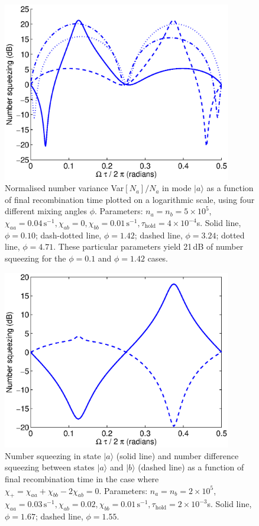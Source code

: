 \documentclass{iopart}
\begin{document}
\begin{figure}
    \centering
    \includegraphics[width=10cm]{figures/analytic_two_mode_examples.eps}
    \caption{Normalised number variance Var$[N_a]/N_a$ in mode $|a \rangle$ as a function of final recombination time plotted on a logarithmic scale, using four different mixing angles $\phi$. Parameters: $n_a = n_b =5 \times 10^5$, $\chi_{aa}=0.04\, \text{s}^{-1}, \chi_{ab}=0, \chi_{bb}=0.01\,\text{s}^{-1}, \tau_{\mathrm{hold}}=4\times 10^{-4}$s. Solid line, $\phi=0.10$; dash-dotted line, $\phi=1.42$; dashed line, $\phi=3.24$; dotted line, $\phi=4.71$. These particular parameters yield 21\,dB of number squeezing for the $\phi=0.1$ and $\phi=1.42$ cases.} 
    \label{figTwoModeAnalyticExamples}
\end{figure}

\begin{figure}
    \centering
    \includegraphics[width=10cm]{figures/zero_effective_chi.eps}
    \caption{Number squeezing in state $|a\rangle$ (solid line) and number difference squeezing between states $|a\rangle$ and $|b\rangle$ (dashed line) as a function of final recombination time in the case where $\chi_+ = \chi_{aa} + \chi_{bb} - 2 \chi_{ab} = 0$. Parameters: $n_a = n_b = 2 \times 10^5$, $\chi_{aa}=0.03\, \text{s}^{-1}, \chi_{ab}=0.02, \chi_{bb}=0.01\,\text{s}^{-1}, \tau_{\mathrm{hold}}=2\times 10^{-3}$s. Solid line, $\phi=1.67$; dashed line, $\phi=1.55$.} 
    \label{figZeroEffectiveChi}
\end{figure}
\end{document}
